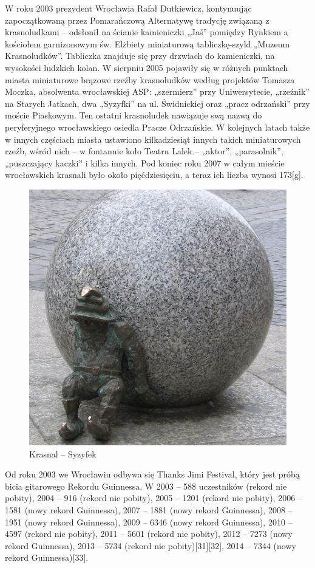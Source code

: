 \documentclass{article}
\begin{document}
W roku 2003 prezydent Wrocławia Rafał Dutkiewicz, kontynuując zapoczątkowaną przez Pomarańczową Alternatywę tradycję związaną z krasnoludkami – odsłonił na ścianie kamieniczki „Jaś” pomiędzy Rynkiem a kościołem garnizonowym św. Elżbiety miniaturową tabliczkę-szyld „Muzeum Krasnoludków”. Tabliczka znajduje się przy drzwiach do kamieniczki, na wysokości ludzkich kolan. W sierpniu 2005 pojawiły się w różnych punktach miasta miniaturowe brązowe rzeźby krasnoludków według projektów Tomasza Moczka, absolwenta wrocławskiej ASP: „szermierz” przy Uniwersytecie, „rzeźnik” na Starych Jatkach, dwa „Syzyfki” na ul. Świdnickiej oraz „pracz odrzański” przy moście Piaskowym. Ten ostatni krasnoludek nawiązuje swą nazwą do peryferyjnego wrocławskiego osiedla Pracze Odrzańskie. W kolejnych latach także w innych częściach miasta ustawiono kilkadziesiąt innych takich miniaturowych rzeźb, wśród nich – w fontannie koło Teatru Lalek – „aktor”, „parasolnik”, „puszczający kaczki” i kilka innych. Pod koniec roku 2007 w całym mieście wrocławskich krasnali było około pięćdziesięciu, a teraz ich liczba wynosi 173[g].
 \begin{figure}[h!]
\centering
\includegraphics[scale=1]{21.jpg}
\caption{Krasnal – Syzyfek}
\end{figure}
Od roku 2003 we Wrocławiu odbywa się Thanks Jimi Festival, który jest próbą bicia gitarowego Rekordu Guinnessa. W 2003 – 588 uczestników (rekord nie pobity), 2004 – 916 (rekord nie pobity), 2005 – 1201 (rekord nie pobity), 2006 – 1581 (nowy rekord Guinnessa), 2007 – 1881 (nowy rekord Guinnessa), 2008 – 1951 (nowy rekord Guinnessa), 2009 – 6346 (nowy rekord Guinnessa), 2010 – 4597 (rekord nie pobity), 2011 – 5601 (rekord nie pobity), 2012 – 7273 (nowy rekord Guinnessa), 2013 – 5734 (rekord nie pobity)[31][32], 2014 – 7344 (nowy rekord Guinnessa)[33].
\end{document}
